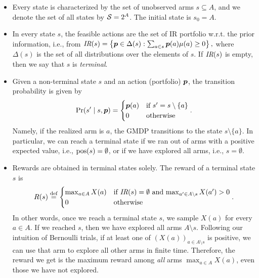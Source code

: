 \begin{itemize}%
    \item Every state is characterized by the set of unobserved arms $s \subseteq A$, and we denote the set of all states by $\mathcal{S}=2^A$. The initial state is $s_0=A$. 
    \item In every state $s$, the feasible actions are the set of IR portfolio w.r.t. the prior information, i.e., from
    $
    \textit{IR}(s)=\left\{\boldsymbol{ p } \in \Delta(s) : \sum_{a\in s}\boldsymbol{ p }(a)\mu(a) \geq 0 \right\},
    $
    where $\Delta(s)$ is the set of all distributions over the elements of $s$. If $\textit{IR}(s)$ is empty, then we say that $s$ is \textit{terminal}. 
    \item Given a non-terminal state $s$ and an action (portfolio) $\boldsymbol{ p }$, the transition probability is given by
    \[
    \Pr(s'\mid s, \boldsymbol{ p })=
    \begin{cases}
\boldsymbol{ p }(a) & \textnormal{if $s' = s \setminus \{a\}$}\\
0 & \textnormal{otherwise}
\end{cases}.
    \]
    Namely, if the realized arm is $a$, the GMDP transitions to the state $s\setminus \{ a\}$. In particular, we can reach a terminal state if we ran out of arms with a positive expected value, i.e., $\textnormal{pos}(s)=\emptyset$, or if we have explored all arms, i.e., $s=\emptyset$.
    \item Rewards are obtained in terminal states solely. The reward of a terminal state $s$ is
\[
R(s) \stackrel{\text{def}}{=}
\begin{cases}
\max_{a\in A} X(a) & \textnormal{if $ \textit{IR}(s)=\emptyset$ and $\max_{a'\in A\setminus s} X(a')>0$}\\
0 & \textnormal{otherwise}
\end{cases}.
\]
In other words, once we reach a terminal state $s$, we sample $X(a)$ for every $a\in A$. If we reached $s$, then we have explored all arms $A\setminus s$. Following our intuition of Bernoulli trials, if at least one of $(X(a))_{a\in A\setminus s}$ is positive, we can use that arm to explore all other arms in finite time. Therefore, the reward we get is the maximum reward among \textit{all} arms $\max_{a\in A} X(a)$, even those we have not explored. 
\end{itemize}


